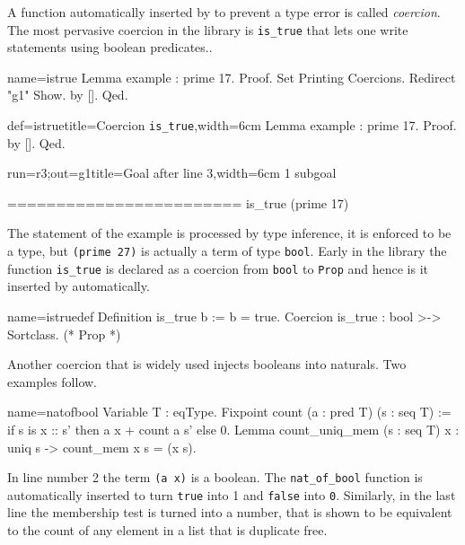 A function automatically inserted by \Coq{} to prevent a type
error is called \emph{coercion}.
The most pervasive coercion in the \mcbMC{} library is
\lstinline/is_true/ that lets one write statements using boolean
predicates..

\begin{coqdef}{name=istrue}
Lemma example : prime 17.
Proof.
Set Printing Coercions. Redirect "g1" Show.
by [].
Qed.
\end{coqdef}
\begin{coq}{def=istrue}{title=Coercion \lstinline/is_true/,width=6cm}
Lemma example : prime 17.
Proof.  by [].  Qed.
\end{coq}
\begin{coqout}{run=r3;out=g1}{title=Goal after line 3,width=6cm}
1 subgoal

========================
is_true (prime 17)
\end{coqout}

The statement of the example is processed by type inference,
it is enforced to be a type, but \lstinline/(prime 27)/ is actually
a term of type \lstinline/bool/.  Early in the library the
function \lstinline/is_true/ is declared as a coercion from
\lstinline/bool/ to \lstinline/Prop/ and hence is it inserted
by \Coq{} automatically.

\begin{coq}{name=istruedef}{}
Definition is_true b := b = true.
Coercion is_true : bool >-> Sortclass. (* Prop *)
\end{coq}

Another coercion that is widely used injects booleans into naturals.
Two examples follow.

\begin{coq}{name=natofbool}{}
Variable T : eqType.
Fixpoint count (a : pred T) (s : seq T) :=
  if s is x :: s' then a x + count a s' else 0.
Lemma count_uniq_mem (s : seq T) x :
  uniq s -> count_mem x s = (x \in s).
\end{coq}

In line number 2 the term \lstinline/(a x)/ is a boolean.  The
\lstinline/nat_of_bool/ function is automatically inserted to turn
\lstinline/true/ into 1 and \lstinline/false/ into \lstinline/0/.
Similarly, in the last line the membership test is turned into
a number, that is shown to be equivalent to the count of any
element in a list that is duplicate free.

